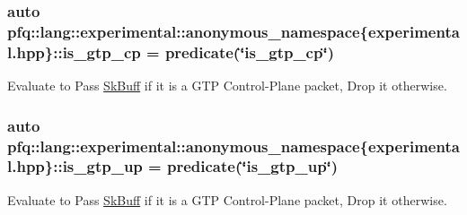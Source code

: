 \hypertarget{namespacepfq_1_1lang_1_1experimental_1_1anonymous__namespace_02experimental_8hpp_03_ade25d79513e3131a54a05e23d25a7539}{
\subsubsection[{is\+\_\+gtp\+\_\+cp}]{\setlength{\rightskip}{0pt plus 5cm}auto pfq\+::lang\+::experimental\+::anonymous\+\_\+namespace\{experimental.\+hpp\}\+::is\+\_\+gtp\+\_\+cp = {\bf predicate}(\char`\"{}is\+\_\+gtp\+\_\+cp\char`\"{})}}\label{namespacepfq_1_1lang_1_1experimental_1_1anonymous__namespace_02experimental_8hpp_03_ade25d79513e3131a54a05e23d25a7539}


Evaluate to {\ttfamily Pass} \hyperlink{structpfq_1_1lang_1_1SkBuff}{Sk\+Buff} if it is a G\+T\+P Control-\/\+Plane packet, {\ttfamily Drop} it otherwise. 

\hypertarget{namespacepfq_1_1lang_1_1experimental_1_1anonymous__namespace_02experimental_8hpp_03_a8c12f3cb8c8faaab619e0feb874ed0c3}{
\subsubsection[{is\+\_\+gtp\+\_\+up}]{\setlength{\rightskip}{0pt plus 5cm}auto pfq\+::lang\+::experimental\+::anonymous\+\_\+namespace\{experimental.\+hpp\}\+::is\+\_\+gtp\+\_\+up = {\bf predicate}(\char`\"{}is\+\_\+gtp\+\_\+up\char`\"{})}}\label{namespacepfq_1_1lang_1_1experimental_1_1anonymous__namespace_02experimental_8hpp_03_a8c12f3cb8c8faaab619e0feb874ed0c3}


Evaluate to {\ttfamily Pass} \hyperlink{structpfq_1_1lang_1_1SkBuff}{Sk\+Buff} if it is a G\+T\+P Control-\/\+Plane packet, {\ttfamily Drop} it otherwise. 

